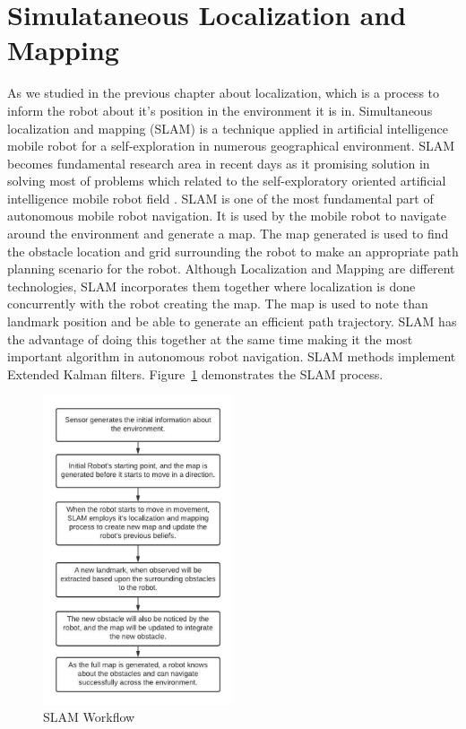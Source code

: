 \section{Simulataneous Localization and Mapping}
As we studied in the previous chapter about localization, which is a process to inform the robot about it's position in the environment it is in. 
Simultaneous localization and mapping (SLAM)
is a technique applied in artificial intelligence mobile robot for
a self-exploration in numerous geographical environment.
SLAM becomes fundamental research area in recent days as it
promising solution in solving most of problems which related
to the self-exploratory oriented artificial intelligence mobile
robot field \cite{7482163}. SLAM is one of the most fundamental part of autonomous mobile robot navigation. It is used by the mobile robot to navigate around the environment 
and generate a map. The map generated is used to find the obstacle location and grid surrounding the robot to make an appropriate path planning scenario for the robot.
Although Localization and Mapping are different technologies, SLAM incorporates them together where localization is done concurrently with the robot creating the map.
The map is used to note than landmark position and be able to generate an efficient path trajectory. SLAM has the advantage of doing this together at the same time making it the most important 
algorithm in autonomous robot navigation. SLAM methods implement Extended Kalman filters. Figure~\ref{fig:SLAMFlowchart} demonstrates the SLAM process.
\begin{figure}[th]
    \centering
    \includegraphics[width=0.5\textwidth]{Figures/SLAM_flowchart.jpeg}
    \decoRule
    \caption[]{SLAM Workflow \cite{7482163}}
    \label{fig:SLAMFlowchart}
\end{figure}
